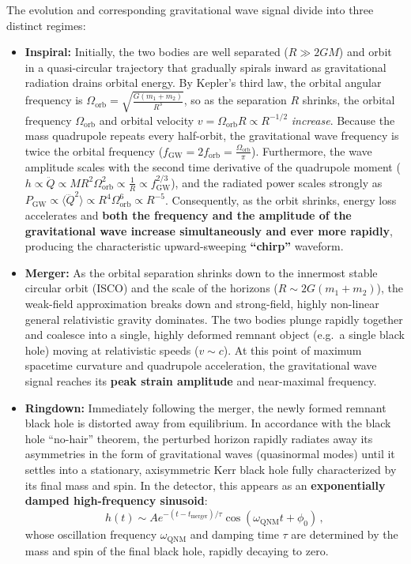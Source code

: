 \documentclass[12pt]{article}
\newcommand{\be}{\begin{equation}}
\newcommand{\ee}{\end{equation}}
\begin{document}
\begin{enumerate}[label=\alph*)]
The evolution and corresponding gravitational wave signal divide into three distinct regimes:
\begin{itemize}
\item \textbf{Inspiral:} Initially, the two bodies are well separated ($R \gg 2GM$) and orbit in a quasi-circular trajectory that gradually spirals inward as gravitational radiation drains orbital energy. By Kepler's third law, the orbital angular frequency is $\Omega_{\text{orb}} = \sqrt{\frac{G(m_1+m_2)}{R^3}}$, so as the separation $R$ shrinks, the orbital frequency $\Omega_{\text{orb}}$ and orbital velocity $v = \Omega_{\text{orb}} R \propto R^{-1/2}$ \emph{increase}. Because the mass quadrupole repeats every half-orbit, the gravitational wave frequency is twice the orbital frequency ($f_{\text{GW}} = 2 f_{\text{orb}} = \frac{\Omega_{\text{orb}}}{\pi}$). Furthermore, the wave amplitude scales with the second time derivative of the quadrupole moment ($h \propto \ddot{Q} \propto M R^2 \Omega_{\text{orb}}^2 \propto \frac{1}{R} \propto f_{\text{GW}}^{2/3}$), and the radiated power scales strongly as $P_{\text{GW}} \propto \langle \dddot{Q}^2 \rangle \propto R^4 \Omega_{\text{orb}}^6 \propto R^{-5}$. Consequently, as the orbit shrinks, energy loss accelerates and \textbf{both the frequency and the amplitude of the gravitational wave increase simultaneously and ever more rapidly}, producing the characteristic upward-sweeping \textbf{``chirp''} waveform.

\item \textbf{Merger:} As the orbital separation shrinks down to the innermost stable circular orbit (ISCO) and the scale of the horizons ($R \sim 2G(m_1+m_2)$), the weak-field approximation breaks down and strong-field, highly non-linear general relativistic gravity dominates. The two bodies plunge rapidly together and coalesce into a single, highly deformed remnant object (e.g.\ a single black hole) moving at relativistic speeds ($v \sim c$). At this point of maximum spacetime curvature and quadrupole acceleration, the gravitational wave signal reaches its \textbf{peak strain amplitude} and near-maximal frequency.

\item \textbf{Ringdown:} Immediately following the merger, the newly formed remnant black hole is distorted away from equilibrium. In accordance with the black hole ``no-hair'' theorem, the perturbed horizon rapidly radiates away its asymmetries in the form of gravitational waves (quasinormal modes) until it settles into a stationary, axisymmetric Kerr black hole fully characterized by its final mass and spin. In the detector, this appears as an \textbf{exponentially damped high-frequency sinusoid}:
\be
h(t) \sim A e^{-(t - t_{\text{merger}})/\tau} \cos\left(\omega_{\text{QNM}} t + \phi_0\right) \,,
\ee
whose oscillation frequency $\omega_{\text{QNM}}$ and damping time $\tau$ are determined by the mass and spin of the final black hole, rapidly decaying to zero.
\end{itemize}


\end{enumerate}
\end{document}
